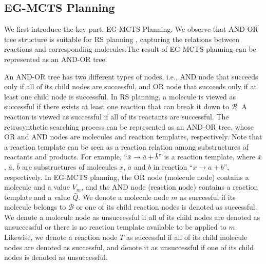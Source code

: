 \documentclass[sn-mathphys,Numbered]{sn-jnl}
\begin{document}
\subsection{EG-MCTS Planning}
We first introduce the key part, EG-MCTS Planning.
We observe that AND-OR tree structure is suitable for RS planning \citep{aaai12,DFPN-E2019,retro2020,2022}, capturing the relations between reactions and corresponding molecules.The result of EG-MCTS planning can be represented as an AND-OR tree.

An AND-OR tree has two different types of nodes, i.e., AND node that succeeds only if all of its child nodes are successful, and OR node that succeeds only if at least one child node is successful. In RS planning, a molecule is viewed as successful if there exists at least one reaction that can break it down to $\mathcal{B}$. A reaction is viewed as successful if all of its reactants are successful. The retrosynthetic searching process can be represented as an AND-OR tree, whose OR and AND nodes are molecules and reaction templates, respectively. Note that a reaction template can be seen as a reaction relation among substructures of reactants and products. For example, ``$\bar{x} \rightarrow \bar{a}+\bar{b}$'' is a reaction template, where $\bar{x}$, $\bar{a}$, $\bar{b}$ are substructures of molecules $x$, $a$ and $b$ in reaction ``$x\rightarrow a+b$'', respectively. 
In EG-MCTS planning, the OR node (molecule node) contains a molecule and a value $V_m$, and the AND node (reaction node) contains a reaction template and a value $\bar{Q}$. We denote a molecule node $m$ as successful if its molecule belongs to $\mathcal B$ or one of its child reaction nodes is denoted as successful. We denote a molecule node as unsuccessful if all of its child nodes are denoted as unsuccessful or there is no reaction template available to be applied to $m$. Likewise, we denote a reaction node $T$ as successful if all of its child molecule nodes are denoted as successful, and denote it as unsuccessful if one of its child nodes is denoted as unsuccessful.
\end{document}
